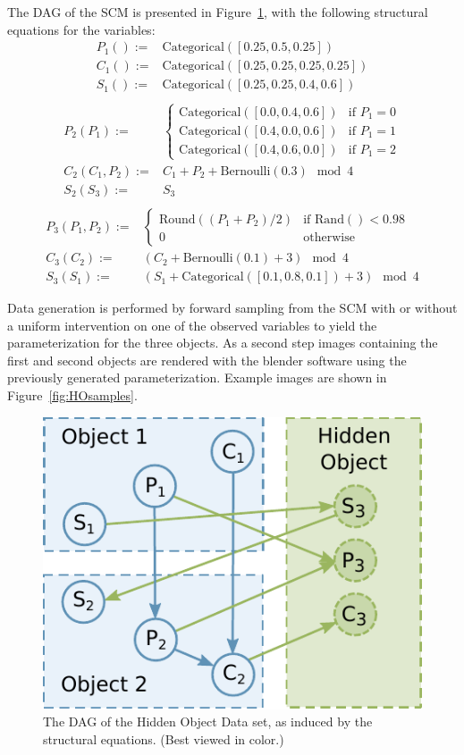 \documentclass{article}
\begin{document}
The DAG of the SCM is presented in Figure~\ref{fig:SCMHO}, with the following structural equations for the variables:
\[
\begin{split}
  P_1() := & \text{Categorical}([0.25, 0.5, 0.25]) \\
  C_1() := & \text{Categorical}([0.25, 0.25, 0.25, 0.25]) \\
  S_1() := & \text{Categorical}([0.25, 0.25, 0.4, 0.6]) \\
\end{split}
\]
\[
\begin{split}
  P_2(P_1) := &
  \begin{cases}
    \text{Categorical}([0.0, 0.4, 0.6]) & \text{if } P_1 = 0\\
    \text{Categorical}([0.4, 0.0, 0.6]) & \text{if } P_1 = 1\\
    \text{Categorical}([0.4, 0.6, 0.0]) & \text{if } P_1 = 2
  \end{cases} \\
  C_2(C_1, P_2) := & C_1 + P_2 + \text{Bernoulli}(0.3) \mod 4 \\
  S_2(S_3) := & S_3 \\
\end{split}
\]
\[
\begin{split}
  P_3(P_1, P_2) :=  &
  \begin{cases}
    \text{Round}((P_1 + P_2) / 2) & \text{if } \text{Rand}() < 0.98\\
    0 & \text{otherwise}
  \end{cases} \\
  C_3(C_2) := & (C_2 + \text{Bernoulli}(0.1) + 3) \mod 4 \\
  S_3(S_1) := & (S_1 + \text{Categorical}([0.1, 0.8, 0.1]) + 3) \mod 4
\end{split}
\]

Data generation is performed by forward sampling from the SCM with or without a uniform intervention on one of the observed variables to yield the parameterization for the three objects. As a second step images containing the first and second objects are rendered with the blender software \citep{blender} using the previously generated parameterization. Example images are shown in Figure~\ref{fig:HOsamples}.

\begin{figure}[h!]
\centering
\includegraphics[width=0.35\linewidth]{figure_HiddenObjectDAG.pdf}
\caption{The DAG of the Hidden Object Data set, as induced by the structural equations. (Best viewed in color.)}
\label{fig:SCMHO}
\end{figure}




\end{document}
